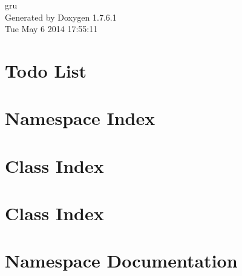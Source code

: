 \documentclass[a4paper]{book}
\begin{document}
\hypersetup{pageanchor=false,citecolor=blue}
\begin{titlepage}
\vspace*{7cm}
\begin{center}
{\Large gru }\\
\vspace*{1cm}
{\large \-Generated by Doxygen 1.7.6.1}\\
\vspace*{0.5cm}
{\small Tue May 6 2014 17:55:11}\\
\end{center}
\end{titlepage}
\clearemptydoublepage
{}
\tableofcontents
\clearemptydoublepage
{}
\hypersetup{pageanchor=true,citecolor=blue}
\chapter{\-Todo \-List}
\label{todo}
\hypertarget{todo}{}

\chapter{\-Namespace \-Index}

\chapter{\-Class \-Index}

\chapter{\-Class \-Index}

\chapter{\-Namespace \-Documentation}






\end{document}
